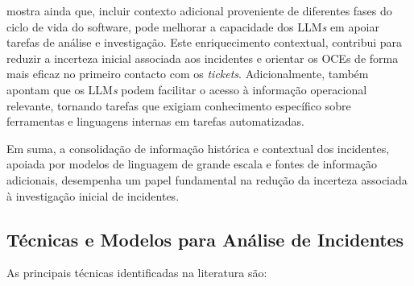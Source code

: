 		\textcite{Reference4} mostra ainda que, incluir contexto adicional proveniente de diferentes fases do ciclo de vida do software, pode melhorar a capacidade dos \gls{LLM}\textit{s} em apoiar tarefas de análise e investigação. Este enriquecimento contextual, contribui para reduzir a incerteza inicial associada aos incidentes e orientar os \gls{OCEs} de forma mais eficaz no primeiro contacto com os \textit{tickets}. Adicionalmente, \textcite{Reference5} também apontam que os \gls{LLM}\textit{s} podem facilitar o acesso à informação operacional relevante, tornando tarefas que exigiam conhecimento específico sobre ferramentas e linguagens internas em tarefas automatizadas.
		
		Em suma, a consolidação de informação histórica e contextual dos incidentes, apoiada por modelos de linguagem de grande escala e fontes de informação adicionais, desempenha um papel fundamental na redução da incerteza associada à investigação inicial de incidentes.
		

	\subsection{Técnicas e Modelos para Análise de Incidentes}
	As principais técnicas identificadas na literatura são:
	
